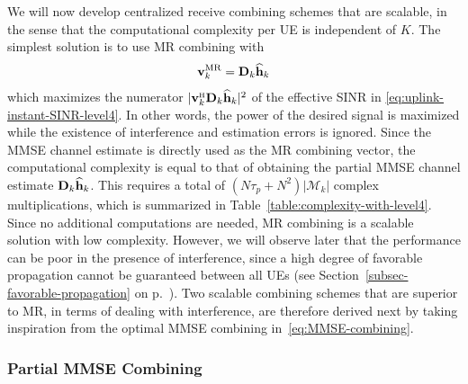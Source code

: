 We will now develop centralized receive combining schemes that are scalable, in the sense that the computational complexity per UE is independent of $K$.
The simplest solution is to use MR combining with
\begin{align}\label{MR_combining_D_k}
\mathbf{v}_k^{{\rm MR}} = \mathbf{D}_{k}\widehat{\mathbf{h}}_k 
\end{align} 
 which maximizes the numerator $ |  \vect{v}_{k}^{\Htran} \vect{D}_{k}\widehat{\vect{h}}_{k} |^2$ of the effective SINR in \eqref{eq:uplink-instant-SINR-level4}.
 In other words, the power of the desired signal is maximized while the existence of interference and estimation errors is ignored. Since the MMSE channel estimate is directly used as the MR combining vector, the computational complexity is equal to that of obtaining the partial MMSE channel estimate $\mathbf{D}_{k}\widehat{\mathbf{h}}_k$. This requires a total of $(N\tau_p + N^2) |\mathcal{M}_k|$ complex multiplications, which is summarized in Table~\ref{table:complexity-with-level4}.
Since no additional computations are needed, MR combining is a scalable solution with low complexity.
However, we will observe later that the performance can be poor in the presence of interference, since a high degree of favorable propagation cannot be guaranteed between all UEs (see Section~\ref{subsec-favorable-propagation} on p.~\pageref{subsec-favorable-propagation}).
Two scalable combining schemes that are superior to MR, in terms of dealing with interference, are therefore derived next by taking inspiration from the optimal MMSE combining in~\eqref{eq:MMSE-combining}. 


\subsubsection{Partial MMSE Combining}

